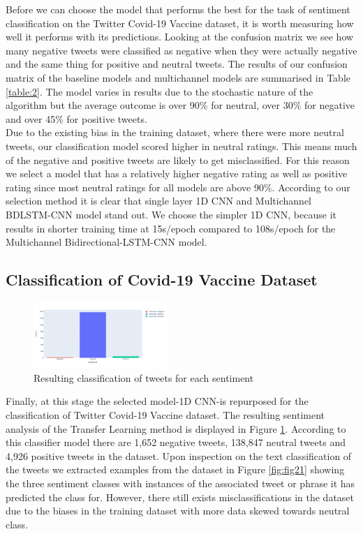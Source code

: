 \documentclass[conference]{IEEEtran}
\begin{document}
Before we can choose the model that performs the best for the task of sentiment classification on the Twitter Covid-19 Vaccine dataset, it is worth measuring how well it performs with its predictions. Looking at the confusion matrix we see how many negative tweets were classified as negative when they were actually negative and the same thing for positive and neutral tweets. The results of our confusion matrix of the baseline models and multichannel models are summarised in Table \ref{table:2}.  The model varies in results due to the stochastic nature of the algorithm but the average outcome is over 90\% for neutral, over 30\% for negative and over 45\% for positive tweets.\\

Due to the existing bias in the training dataset, where there were more neutral tweets, our classification model scored higher in neutral ratings. This means much of the negative and positive tweets are likely to get misclassified. For this reason we select a model that has a relatively higher negative rating as well as positive rating since most neutral ratings for all models are above 90\%. According to our selection method it is clear that single layer 1D CNN and Multichannel BDLSTM-CNN model stand out. We choose the simpler 1D CNN, because it results in shorter training time at 15s/epoch compared to 108s/epoch for the Multichannel Bidirectional-LSTM-CNN model.



\subsection{Classification of Covid-19 Vaccine Dataset}

\begin{figure}[h]
\centering
\includegraphics[width=0.45\textwidth]{newplot.png}
\caption{Resulting classification of tweets for each sentiment}
\label{fig:fig15}
\end{figure} 

Finally, at this stage the selected model-1D CNN-is repurposed for the classification of Twitter Covid-19 Vaccine dataset. The resulting sentiment analysis of the Transfer Learning method is displayed in Figure \ref{fig:fig15}. According to this classifier model there are 1,652 negative tweets, 138,847 neutral tweets and 4,926 positive tweets in the dataset. Upon inspection on the text classification of the tweets we extracted examples from the dataset in Figure \ref{fig:fig21} showing the three sentiment classes with instances of the associated tweet or phrase it has predicted the class for. However, there still exists misclassifications in the dataset due to the biases in the training dataset with more data skewed towards neutral class. 
\end{document}
